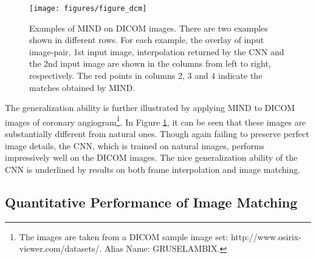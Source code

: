 \documentclass[runningheads]{llncs}
\begin{document}
	\begin{figure}[t]
		\centering
		\texttt{[image: figures/figure\_dcm]}
		\caption{Examples of MIND on DICOM images. There are two examples shown in different rows. For each example,  the overlay of input image-pair, 1st input image, interpolation returned by the CNN and the 2nd input image are shown in the columns from left to right, respectively. The red points in columns 2, 3 and 4 indicate the matches obtained by MIND.}
		\label{fig:Interpolation_dcm}
	\end{figure}
	
	The generalization ability is further illustrated by applying MIND to DICOM images of coronary angiogram\footnote{The images are taken from a DICOM sample image set: http://www.osirix-viewer.com/datasets/. Alias Name: GRUSELAMBIX.}. In Figure \ref{fig:Interpolation_dcm}, it can be seen that these images are substantially different from natural ones. Though again failing to preserve perfect image details, the CNN, which is trained on natural images, performs impressively well on the DICOM images. The nice generalization ability of the CNN is underlined by results on both frame interpolation and image matching. 
	
	
	\vspace{-0.2cm}
	\subsection{Quantitative Performance of Image Matching}
	\label{sec:matching}
	\vspace{-0.3cm}
	
\end{document}
